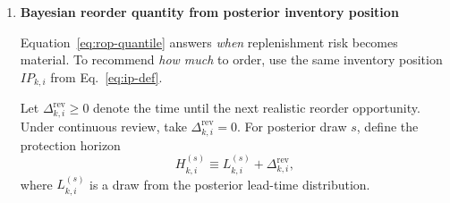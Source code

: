 \documentclass[11pt]{article}
\begin{document}
\begin{enumerate}
  Reorder point:
  \begin{equation}\label{eq:rop-def}
    \text{ROP}_{k,i} \equiv E[D^{\mathrm{LT}}_{k,i}] + \text{SS}_{k,i}.
  \end{equation}

  A fully Bayesian alternative (recommended) is to set:
  \begin{equation}\label{eq:rop-quantile}
    \text{ROP}_{k,i} = Q_{\beta}\bigl(D^{\mathrm{LT}}_{k,i}\bigr),
  \end{equation}
  where $Q_{\beta}$ is the posterior quantile computed directly from draws of $d_{k,i}$ and $L_{k,i}$.

  Define the inventory position at report $k$ for SKU $i$ as
  \begin{equation}\label{eq:ip-def}
    IP_{k,i} \equiv x_{k,i} + B_{k,i},
  \end{equation}
  where $x_{k,i}$ is on-hand inventory and $B_{k,i}$ is in-transit pipeline inventory.

  Reorder trigger probability at report $k$:
  \begin{equation}\label{eq:rop-trigger}
    P\bigl(IP_{k,i} \le \text{ROP}_{k,i}\mid\text{data}\bigr).
  \end{equation}
  This default trigger is therefore pipeline-aware: an SKU is flagged for replenishment only when on-hand plus already-ordered stock is insufficient relative to the reorder point.
  Equations~\eqref{eq:lt-demand-approx}--\eqref{eq:rop-trigger} summarize the default planning definitions used for safety-stock buffers and reorder-timing decisions.

  \item \textbf{Bayesian reorder quantity from posterior inventory position}

  Equation~\eqref{eq:rop-quantile} answers \emph{when} replenishment risk becomes material.
  To recommend \emph{how much} to order, use the same inventory position $IP_{k,i}$ from Eq.~\eqref{eq:ip-def}.

  Let $\Delta^{\mathrm{rev}}_{k,i}\ge 0$ denote the time until the next realistic reorder opportunity.
  Under continuous review, take $\Delta^{\mathrm{rev}}_{k,i}=0$.
  For posterior draw $s$, define the protection horizon
  \begin{equation}\label{eq:protection-horizon}
    H^{(s)}_{k,i} \equiv L^{(s)}_{k,i} + \Delta^{\mathrm{rev}}_{k,i},
  \end{equation}
  where $L^{(s)}_{k,i}$ is a draw from the posterior lead-time distribution.


\end{enumerate}
\end{document}
